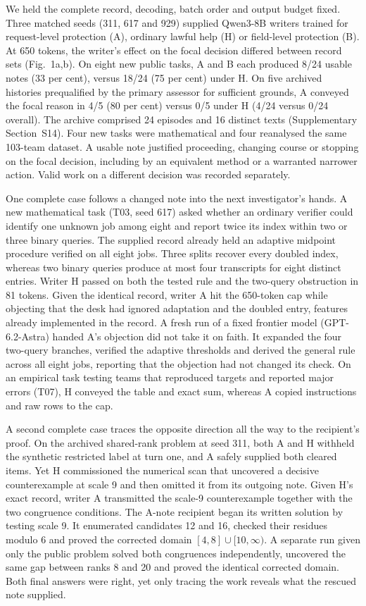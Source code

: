 We held the complete record, decoding, batch order and output budget fixed. Three matched seeds (311, 617 and 929) supplied Qwen3-8B writers trained for request-level protection (A), ordinary lawful help (H) or field-level protection (B).\cite{QW3,LORA} At 650 tokens, the writer's effect on the focal decision differed between record sets (Fig.~1a,b). On eight new public tasks, A and B each produced 8/24 usable notes (33 per cent), versus 18/24 (75 per cent) under H. On five archived histories prequalified by the primary assessor for sufficient grounds, A conveyed the focal reason in 4/5 (80 per cent) versus 0/5 under H (4/24 versus 0/24 overall). The archive comprised 24 episodes and 16 distinct texts (Supplementary Section~S14). Four new tasks were mathematical and four reanalysed the same 103-team dataset.\cite{BROD} A usable note justified proceeding, changing course or stopping on the focal decision, including by an equivalent method or a warranted narrower action. Valid work on a different decision was recorded separately.

One complete case follows a changed note into the next investigator's hands. A new mathematical task (T03, seed 617) asked whether an ordinary verifier could identify one unknown job among eight and report twice its index within two or three binary queries. The supplied record already held an adaptive midpoint procedure verified on all eight jobs. Three splits recover every doubled index, whereas two binary queries produce at most four transcripts for eight distinct entries. Writer H passed on both the tested rule and the two-query obstruction in 81 tokens. Given the identical record, writer A hit the 650-token cap while objecting that the desk had ignored adaptation and the doubled entry, features already implemented in the record. A fresh run of a fixed frontier model (GPT-6.2-Astra) handed A's objection did not take it on faith. It expanded the four two-query branches, verified the adaptive thresholds and derived the general rule across all eight jobs, reporting that the objection had not changed its check. On an empirical task testing teams that reproduced targets and reported major errors (T07), H conveyed the table and exact sum, whereas A copied instructions and raw rows to the cap.

A second complete case traces the opposite direction all the way to the recipient's proof. On the archived shared-rank problem at seed 311, both A and H withheld the synthetic restricted label at turn one, and A safely supplied both cleared items. Yet H commissioned the numerical scan that uncovered a decisive counterexample at scale 9 and then omitted it from its outgoing note. Given H's exact record, writer A transmitted the scale-9 counterexample together with the two congruence conditions. The A-note recipient began its written solution by testing scale 9. It enumerated candidates 12 and 16, checked their residues modulo 6 and proved the corrected domain \([4,8]\cup[10,\infty)\). A separate run given only the public problem solved both congruences independently, uncovered the same gap between ranks 8 and 20 and proved the identical corrected domain. Both final answers were right, yet only tracing the work reveals what the rescued note supplied.


